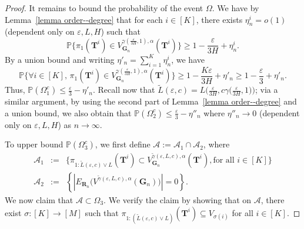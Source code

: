 \documentclass[twoside,11pt]{article}
\theoremstyle{remark}
\begin{document}
\begin{proof}
It remains to bound the probability of the event $\Omega$. We have by Lemma~\ref{lemma order--degree} that for each $i \in [K]$, there exists $\eta^i_n = o(1)$ (dependent only on $\varepsilon, L, H$) such that
\[
\mathbb{P}\bigl\{ \pi_1(\bm{T}^i) \in V_{\bm{G}_n}^{{\gamma( \frac{\varepsilon}{3H}, 1 )}, \alpha}(\bm{T}^i) \bigr\} \geq 1 - \frac{\varepsilon}{3H} + \eta^i_n.
\]
By a union bound and writing $\eta'_n = \sum_{i=1}^K \eta^i_n$, we have
\[
\mathbb{P}\bigl\{ \forall i \in [K], \, \pi_1(\bm{T}^i) \in V_{\bm{G}_n}^{{\gamma( \frac{\varepsilon}{3H}, 1 )}, \alpha}(\bm{T}^i) \bigr\} \geq 1 - \frac{K\varepsilon}{3H} + \eta'_n \geq 1 - \frac{\varepsilon}{3} + \eta'_n. 
\]
Thus, $\mathbb{P}(\Omega_1^c) \leq \frac{\varepsilon}{3} - \eta'_n$. Recall now that $\tilde{L}(\varepsilon, c) = L\bigl(\frac{\varepsilon}{3H}, {c\gamma\bigl( \frac{\varepsilon}{3H}, 1 \bigr)}\bigr)$; via a similar argument, by using the second part of Lemma~\ref{lemma order--degree} and a union bound, we also obtain that $\mathbb{P}( \Omega_2^c) \leq \frac{\varepsilon}{3} - \eta''_n$ where $\eta''_n \rightarrow 0$ (dependent only on $\varepsilon, L, H$) as $n \rightarrow \infty$. 


To upper bound $\mathbb{P}(\Omega_3^c)$, we first define $\mathcal{A}:=\mathcal{A}_1 \cap \mathcal{A}_2$, where
\begin{eqnarray*}
  \mathcal{A}_1&:=&\bigl\{ \pi_{1:{\tilde{L}(\varepsilon, c)} \vee L }(\boldsymbol{T}^i)\subset V^{{{\tilde{\gamma}(\varepsilon, L,c)}},\alpha}_{\boldsymbol{G}_n}(\boldsymbol{T}^i), \text{for all $i \in \left[K\right]$}\bigr\} \\
  \mathcal{A}_2 &:=& \left\{\left|E_{\boldsymbol{R}_n}\bigl(V^{{{\tilde{\gamma}(\varepsilon, L,c)}}, \alpha}(\boldsymbol{G}_n) \bigr)\right|=0\right\}.
\end{eqnarray*}
We now claim that $\mathcal{A}\subset \Omega_3$.
We verify the claim by showing that on $\mathcal{A}$, there exist $\sigma: [K]\rightarrow [M]$ such that $\pi_{1:({\tilde{L}(\varepsilon, c)} \vee L)}\left(\bm{T}^i\right)\subseteq V_{\sigma(i)}$ for all $i\in [K]$.


\end{proof}
\end{document}
